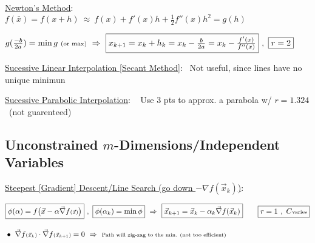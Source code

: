\documentclass[12pt]{article}
\begin{document}
\vspace{15pt}
\underline{Newton's Method}: \ \(
    f(\bar{x}) = f(x+h) 
    \ \approx\ f(x) + f'(x) h + \tfrac{1}{2} f''(x) h^2 
    = g(h)
\) 

\vspace{5pt}
\hspace{10pt}\(
    g(\tfrac{-b}{2a}) = \min g \ \text{\scriptsize(or max)}
    \ \Rightarrow\ \boxed{ x_{k+1} = x_k + h_k = x_k - \tfrac{b}{2a} = x_k - \tfrac{f'(x)}{f''(x)} } \ ,\ \boxed{r=2}
\)

\vspace{15pt}
\underline{Sucessive Linear Interpolation [Secant Method]}: \ {\scriptsize Not useful, since lines have no unique minimun}

\vspace{5pt}
\underline{Sucessive Parabolic Interpolation}: \ {
    \scriptsize Use 3 pts to approx. a parabola w/ \(\boxed{r = 1.324}\) \ (not guarenteed)
}

%
%
%
\vspace{5pt}
\subsection{Unconstrained \(m\)-Dimensions/Independent Variables}

\vspace{5pt}
\underline{Steepest [Gradient] Descent/Line Search (go down \( -\nabla f{\scriptstyle(\vec{x}_k)} \))}: 

\hspace{10pt} \(\begin{aligned}
    &\boxed{ \phi(\alpha) = f \big( \vec{x} - \alpha \vec{\nabla} f{\scriptstyle(\vec{x})} \big) }
        \ , \
        \boxed{ \phi(\alpha_k) = \min \phi }
        \ \Rightarrow \ 
        \boxed{ \vec{x}_{k+1} = \vec{x}_k - \alpha_k \vec{\nabla} f(\vec{x}_k) } 
        \hspace{20pt}
        \boxed{r=1 \ ,\ C \text{\scriptsize varies} }
        \\[10pt]
    &\bullet
        \ \vec{\nabla} f{ \scriptstyle ( \vec{x}_k ) } \cdot \vec{\nabla} f{ \scriptstyle ( \vec{x}_{k+1} ) } = 0
        \ \Rightarrow \ 
        \text{\scriptsize Path will zig-zag to the min. (not too efficient)}
\end{aligned}\)
\end{document}
